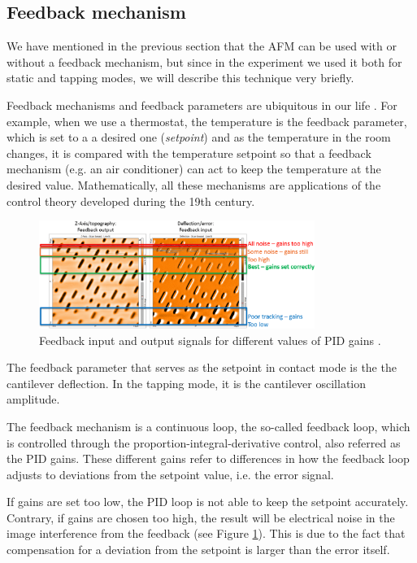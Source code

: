 \documentclass[11pt,a4paper]{article}
\begin{document}
\subsection{Feedback mechanism}
We have mentioned in the previous section that the AFM can be used with or without a feedback mechanism, but since in the experiment we used it both for static and tapping modes, we will describe this technique very briefly.

Feedback mechanisms and feedback parameters are ubiquitous in our life \cite{nanosurf}. For example, when we use a thermostat, the temperature is the feedback parameter, which is set to a a desired one (\emph{setpoint}) and as the temperature in the room changes, it is compared with the temperature setpoint so that a feedback mechanism (e.g. an air conditioner) can act to keep the temperature at the desired value. Mathematically, all these mechanisms are applications of the control theory developed during the 19th century.

\begin{figure}[hbt]
\centering
\includegraphics[width=0.8\textwidth]{afm-modes-feedback}
\caption{Feedback input and output signals for different values of PID gains \cite{nanosurf}.}
\label{fig:feedback}
\end{figure}

The feedback parameter that serves as the setpoint in contact mode is the the cantilever deflection. In the tapping mode, it is the cantilever oscillation amplitude.

The feedback mechanism is a continuous loop, the so-called feedback loop, which is controlled through the proportion-integral-derivative control, also referred as the PID gains. These different gains refer to differences in how the feedback loop adjusts to deviations from the setpoint value, i.e. the error signal. 

If gains are set too low, the PID loop is not able to keep the setpoint accurately. Contrary, if gains are chosen too high, the result will be electrical noise in the image interference from the feedback (see Figure \ref{fig:feedback}). This is due to the fact that compensation for a deviation from the setpoint is larger than the error itself.
\end{document}
